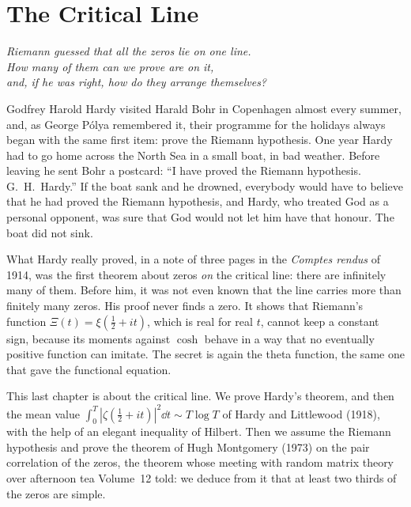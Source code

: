 \chapter{The Critical Line}\label{ch:critical}
\begin{center}\itshape
Riemann guessed that all the zeros lie on one line.\\
How many of them can we prove are on it,\\
and, if he was right, how do they arrange themselves?
\end{center}

Godfrey Harold Hardy visited Harald Bohr in Copenhagen almost every summer, and, as George Pólya remembered it, their programme for the holidays always began with the same first item: prove the Riemann hypothesis. One year Hardy had to go home across the North Sea in a small boat, in bad weather. Before leaving he sent Bohr a postcard: ``I have proved the Riemann hypothesis. G.~H.~Hardy.'' If the boat sank and he drowned, everybody would have to believe that he had proved the Riemann hypothesis, and Hardy, who treated God as a personal opponent, was sure that God would not let him have that honour. The boat did not sink.

What Hardy really proved, in a note of three pages in the \emph{Comptes rendus} of 1914, was the first theorem about zeros \emph{on} the critical line: there are infinitely many of them. Before him, it was not even known that the line carries more than finitely many zeros. His proof never finds a zero. It shows that Riemann's function $\Xi(t)=\xi(\frac12+it)$, which is real for real $t$, cannot keep a constant sign, because its moments against $\cosh$ behave in a way that no eventually positive function can imitate. The secret is again the theta function, the same one that gave the functional equation.

This last chapter is about the critical line. We prove Hardy's theorem, and then the mean value $\int_0^T|\zeta(\frac12+it)|^2\dd t\sim T\log T$ of Hardy and Littlewood (1918), with the help of an elegant inequality of Hilbert. Then we assume the Riemann hypothesis and prove the theorem of Hugh Montgomery (1973) on the pair correlation of the zeros, the theorem whose meeting with random matrix theory over afternoon tea Volume~12 told: we deduce from it that at least two thirds of the zeros are simple.


